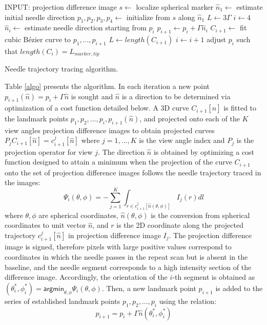 \begin{table}
\hline
\begin{algorithmic}
  \STATE
  \STATE INPUT: projection difference image
  \STATE $s\leftarrow$ localize spherical marker
  \STATE $\hat{n}_1 \leftarrow$ estimate initial needle direction
  \STATE $p_1, p_2, p_3, p_4 \leftarrow$ initialize from $s$ along $\hat{n}_1$
  \STATE $L\leftarrow 3\Gamma$ 
  \STATE $i\leftarrow 4$
    \STATE $\hat{n}_{i} \leftarrow$ estimate needle direction starting from $p_i$
    \STATE $p_{i+1} \leftarrow p_i + \Gamma \hat{n}_{i}$
    \STATE $C_{i+1}\leftarrow$ fit cubic B\'ezier curve to $p_1, ..., p_{i+1}$
    \STATE $L\leftarrow length(C_{i+1})$ 
    \STATE $i\leftarrow i+1$
  \ENDWHILE
  \STATE adjust $p_i$ such that $length(C_i) = L_{marker,tip}$
  \STATE
\end{algorithmic}
\hline
\caption{Needle trajectory tracing algorithm.}
\label{algo}
\end{table}

Table \ref{algo} presents the algorithm. 
In each iteration a new point $p_{i+1}(\hat{n}) = p_i + \Gamma \hat{n}$ is sought and $\hat{n}$ is a direction to be determined via optimization of a cost function detailed below.
A 3D curve $C_{i+1}[\hat{n}]$ is fitted to the landmark points $p_1, p_2, ..., p_i, p_{i+1}(\hat{n})$, and projected onto each of the $K$ view angles projection difference images to obtain projected curves $P_j C_{i+1}[\hat{n}] = c_{i+1}^j[\hat{n}]$ where $j=1,...,K$ is the view angle index and $P_j$ is the projection operator for view $j$.
The direction $\hat{n}$ is obtained by optimizing a cost function designed to attain a minimum when the projection of the curve $C_{i+1}$ onto the set of projection difference images follows the needle trajectory traced in the images:
\[ \Psi_i(\theta, \phi) = -\sum_{j=1}^K{\int_{r \in c_{i+1}^j[\hat{n}(\theta, \phi)]} {I_j(r)dl}} \]
where $ \theta, \phi$ are spherical coordinates, $ \hat{n}(\theta, \phi) $ is the conversion from spherical coordinates to unit vector $ \hat{n} $, and $r$ is the 2D coordinate along the projected trajectory $c_{i+1}^j[\hat{n}]$ in projection difference image $I_j$. The projection difference image is signed, therefore pixels with large positive values correspond to coordinates in which the needle passes in the repeat scan but is absent in the baseline, and the needle segment corresponds to a high intensity section of the difference image.
Accordingly, the orientation of the $i$-th segment is obtained as $(\theta_i^*, \phi_i^*) = \textsf{argmin}_{\theta, \phi} \Psi_i ( \theta, \phi)$. Then, a new landmark point $p_{i+1}$ is added to the series of established landmark points $p_1, p_2, ..., p_i$ using the relation:
$$ p_{i+1} = p_i + \Gamma \hat{n}(\theta_i^*, \phi_i^*) $$

